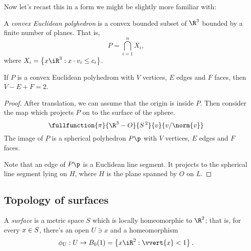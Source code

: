 Now let's recast this in a form we might be slightly more familiar with:

\begin{definition}
	A \emph{convex Euclidean polyhedron} is a convex bounded subset of $\R^3$ bounded by a finite number of planes. That is, %
	\begin{equation*}
		P = \bigcap_{i=1}^n X_i,
	\end{equation*}
	where $X_i = \left\{\xx\iR^3 : \xx\cdot \vv_i \leq c_i\right\}$.
\end{definition}

\begin{corollary}
	If $P$ is a convex Euclidean polyhedrom with $V$ vertices, $E$ edges and $F$ faces, then $V-E+F=2$. %
\end{corollary}

\begin{proof}
	After translation, we can assume that the origin is inside $P$. Then consider the map which projects $P$ on to the surface of the sphere.
	\begin{equation*}
		\fullfunction{\pi}{\R^3-O}{S^{\,2}}{\vv}{\vv/\norm{\vv}}
	\end{equation*}
	The image of $P$ is a spherical polyhedron $P\p$ with $V$ vertices, $E$ edges and $F$ faces. %

	Note that an edge of $P\p$ is a Euclidean line segment. It projects to the spherical line segment lying on $H$, where $H$ is the plane spanned by $O$ on $L$. %
\end{proof}


	\pagebreak

\subsection{Topology of surfaces} %
\label{sub:topology_of_surfaces}

\newcommand{\biggarrow}{\draw [decoration={markings,mark=at position 1 with {\arrow[scale=2]{>>}}},
    		   postaction={decorate},
    		   shorten >=0.4pt]}

\begin{definition}
	A \emph{surface} is a metric space $S$ which is locally homeomorphic to $\R^2$; that is, for every $x\in S$, there's an open $U\ni x$ and a homeomorphism
	\begin{equation*}
		\phi_U: U\to B_0(1) = \left\{ \xx\iR^2 : \vvert{\xx} < 1 \right\}.
	\end{equation*}
\end{definition}

